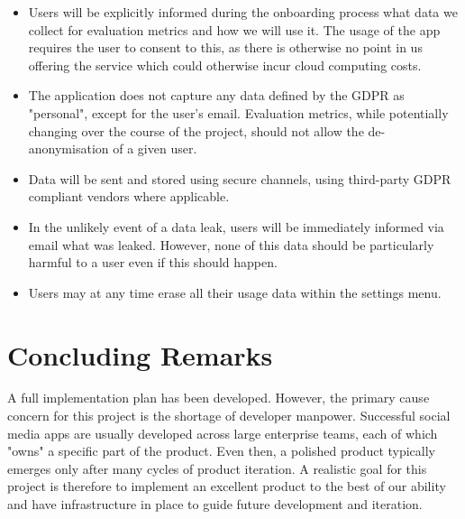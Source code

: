 \begin{itemize}
    \item Users will be explicitly informed during the onboarding process what data we collect for evaluation metrics and how we will use it. The usage of the app requires the user to consent to this, as there is otherwise no point in us offering the service which could otherwise incur cloud computing costs.
    \item The application does not capture any data defined by the GDPR as "personal", except for the user's email. Evaluation metrics, while potentially changing over the course of the project, should not allow the de-anonymisation of a given user.
    \item Data will be sent and stored using secure channels, using third-party GDPR compliant vendors where applicable.
    \item In the unlikely event of a data leak, users will be immediately informed via email what was leaked. However, none of this data should be particularly harmful to a user even if this should happen.
    \item Users may at any time erase all their usage data within the settings menu.
\end{itemize}

\section{Concluding Remarks}
A full implementation plan has been developed. However, the primary cause concern for this project is the shortage of developer manpower. Successful social media apps are usually developed across large enterprise teams, each of which "owns" a specific part of the product. Even then, a polished product typically emerges only after many cycles of product iteration. A realistic goal for this project is therefore to implement an excellent product to the best of our ability and have infrastructure in place to guide future development and iteration.
